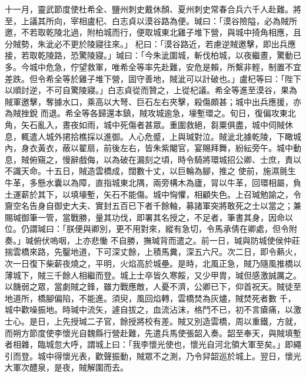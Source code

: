\begin{pinyinscope}
 十一月，靈武節度使杜希全、鹽州刺史戴休顏、夏州刺史常春合兵六千人赴難。將至，上議其所向，宰相盧杞、白志貞以漠谷路為便。瑊曰：「漠谷險隘，必為賊所邀，不若取乾陵北過，附柏城而行，便取城東北雞子堆下營，與城中掎角相應，且分賊勢，朱泚必不更於陵寢往來。」
 杞曰：「漠谷路近，若慮逆賊邀擊，即出兵應接，若取乾陵路，恐驚陵寢。」瑊曰：「今朱泚圍城，斬伐柏城，以夜繼晝，驚動已多。今城中危急，佇望救軍，唯希全等率先赴難，安危是賴，所繫非輕，制置不宜差跌。但令希全等於雞子堆下營，固守善地，賊泚可以計破也。」盧杞等曰：「陛下以順討逆，不可自驚陵寢。」白志貞從而贊之，上從杞議。希全等進至漠谷，果為賊軍邀擊，奪據水口，乘高以大弩、巨石左右夾擊，殺傷頗甚；城中出兵應援，亦為賊挫銳
 而退。希全等各歸還本鎮，賊攻城逾急，壕塹環之。旬日，復偏攻東北角，矢石亂入，晝夜如雨，城中死傷者甚眾。重圍救絕，芻粟俱盡，城中伺賊休息，輒遣人城外捃拾樵採以進御。人心危蹙，上與瑊對泣。賊泚北據乾陵，下瞰城內，身衣黃衣，蔽以翟扇，前後左右，皆朱紫閹官，宴賜拜舞，紛紜旁午。城中動息，賊俯窺之，慢辭戲侮，以為破在漏刻之頃，時令騎將環城招公卿、士庶，責以不識天命。十五日，賊造雲橋成，闊數十丈，以巨輪為腳，推之
 使前，施濕氈生牛革，多懸水囊以為障，直指城東北隅，兩旁構木為廬，冐以牛革，回環相屬，負土運薪於其下，以填壕塹，矢石不能傷。城中恟懼，相顧失色。上召瑊勉諭之，令齎空名告身自御史大夫、實封五百已下者千餘軸，募諸軍突將敢死之士以當之；兼賜瑊御筆一管，當戰勝，量其功伐，即署其名授之，不足者，筆書其身，因命以位。仍謂瑊曰：「朕便與卿別，更不用對來，縱有急切，令馬承倩在卿處，但令附奏。」瑊俯伏嗚咽，上亦悲慟
 不自勝，撫瑊背而遣之。前一日，瑊與防城使侯仲莊揣雲橋來路，先鑿地道，下可深丈餘，上積馬糞，深五六尺。次二日，即令爇火，次一日復下柴薪夜燒之，平明，火焰高於城壘。是時，北風正急，賊乃隨風推橋以薄城下，賊三千餘人相繼而登。城上士卒皆久寒餒，又少甲胄，瑊但感激誠厲之。以饑弱之眾，當劇賊之鋒，雖力戰應敵，人憂不濟，公卿已下，仰首祝天。賊徒至地道所，橋腳偏陷，不能進。須臾，風回焰轉，雲橋焚為灰燼，賊焚死者數
 千，城中歡噪振地。時瑊中流矢，遽自拔之，血流沾沫，格鬥不已，初不言瘡痛，以激士心。是日，上先授瑊二子官，餘授將校有差。賊又別造雲橋，周以重鐵，方就，而朔方節度使李懷光自魏縣行營赴難，先遣兵馬使張韶入奏。韶至奉天，與賊填塹者相雜，臨城忽大呼，謂城上曰：「我李懷光使也，懷光自河北領大軍至矣。」即繩引而登。城中得懷光表，歡聲振動，賊眾不之測，乃令舁韶巡於城上。翌日，懷光大軍次醴泉，是夜，賊解圍而去。




\end{pinyinscope}
